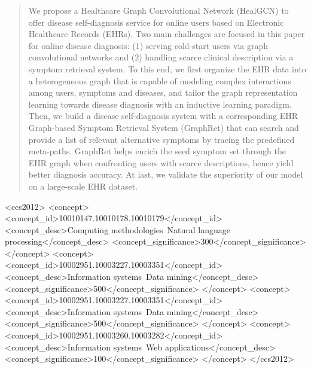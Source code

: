 \documentclass[sigconf]{acmart}
\begin{document}
\begin{abstract}
We propose a Healthcare Graph Convolutional Network (HealGCN) to offer disease self-diagnosis service for online users based on Electronic Healthcare Records (EHRs). Two main challenges are focused in this paper for online disease diagnosis: (1) serving cold-start users via graph convolutional networks and (2) handling scarce clinical description via a symptom retrieval system. To this end, we first organize the EHR data into a heterogeneous graph that is capable of modeling complex interactions among users, symptoms and diseases, and tailor the graph representation learning towards disease diagnosis with an inductive learning paradigm. Then, we build a disease self-diagnosis system with a corresponding EHR Graph-based Symptom Retrieval System (GraphRet) that can search and provide a list of relevant alternative symptoms by tracing the predefined meta-paths. GraphRet helps enrich the seed symptom set through the EHR graph when confronting users with scarce descriptions, hence yield better diagnosis accuracy. At last, we validate the superiority of our model on a large-scale EHR dataset.
\end{abstract}

\begin{CCSXML}
<ccs2012>
   <concept>
       <concept_id>10010147.10010178.10010179</concept_id>
       <concept_desc>Computing methodologies~Natural language processing</concept_desc>
       <concept_significance>300</concept_significance>
       </concept>
   <concept>
       <concept_id>10002951.10003227.10003351</concept_id>
       <concept_desc>Information systems~Data mining</concept_desc>
       <concept_significance>500</concept_significance>
       </concept>
   <concept>
       <concept_id>10002951.10003227.10003351</concept_id>
       <concept_desc>Information systems~Data mining</concept_desc>
       <concept_significance>500</concept_significance>
       </concept>
   <concept>
       <concept_id>10002951.10003260.10003282</concept_id>
       <concept_desc>Information systems~Web applications</concept_desc>
       <concept_significance>100</concept_significance>
       </concept>
 </ccs2012>
\end{CCSXML}

\end{document}
